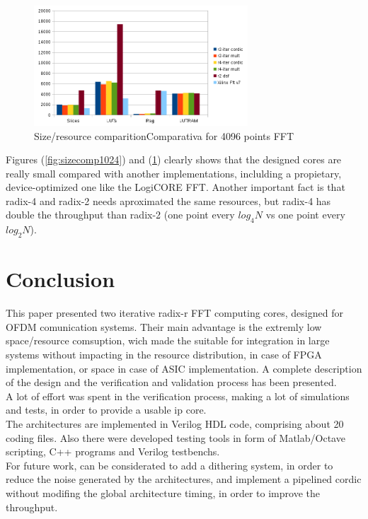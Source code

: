 \documentclass[conference]{IEEEtran}
\begin{document}
\begin{figure}[htb!]
        \centering
        \includegraphics[width=8cm]{./figures/sizecomp4096.png}
        \caption{Size/resource comparitionComparativa for 4096 points FFT}
        \label{fig:sizecomp4096}
\end{figure}

Figures (\ref{fig:sizecomp1024}) and (\ref{fig:sizecomp4096}) clearly shows that the designed cores are really small compared 
with another implementations, inclulding a propietary, device-optimized one like the LogiCORE FFT. Another important fact is that 
radix-4 and radix-2 needs aproximated the same resources, but radix-4 has double the throughput than radix-2 (one point every 
$log_4N$ vs one point every $log_2N$).  

\section{Conclusion}
This paper presented two iterative radix-r FFT computing cores, designed for OFDM
comunication systems. Their main advantage is the extremly low space/resource comsuption, wich made the suitable for
integration in large systems without impacting in the resource distribution, in case of FPGA implementation, or space in case of
ASIC implementation. A complete description of the design and the verification and validation process has been presented.\\ 
A lot of effort was spent in the verification process, making a lot of simulations and tests, in order to provide a  
usable ip core.\\
The architectures are implemented in Verilog HDL code, comprising about 20 coding files. Also there were developed testing tools
in form of Matlab/Octave scripting, C++ programs and Verilog testbenchs.\\
For future work, can be considerated to add a dithering system, in order to reduce the noise generated by the architectures, and 
implement a pipelined cordic without modifing the global architecture timing, in order to improve the throughput. 
\end{document}
